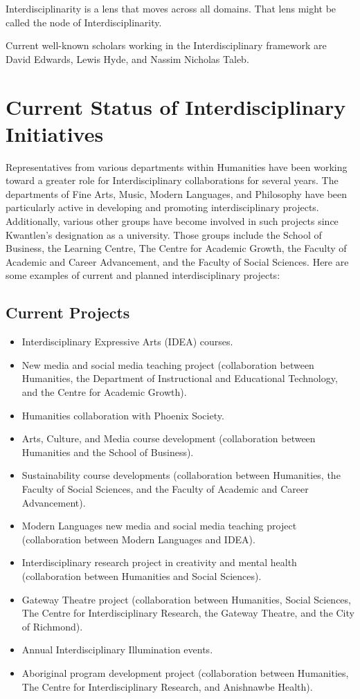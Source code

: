 \documentclass[12pt,DIV11,letterpaper,oneside,abstractoff,headsepline]{scrreprt}
\begin{document}
Interdisciplinarity is a lens that moves across all domains. That lens might be called the node of Interdisciplinarity.

Current well-known scholars working in the Interdisciplinary framework are David Edwards, Lewis Hyde, and Nassim Nicholas Taleb.

\newpage
\section{Current Status of Interdisciplinary Initiatives}
\label{sec-2}

Representatives from various departments within Humanities have been working toward a greater role for Interdisciplinary collaborations for several years. The departments of Fine Arts, Music, Modern Languages, and Philosophy have been particularly active in developing and promoting interdisciplinary projects. Additionally, various other groups have become involved in such projects since Kwantlen's designation as a university. Those groups include the School of Business, the Learning Centre, The Centre for Academic Growth, the Faculty of Academic and Career Advancement, and the Faculty of Social Sciences. Here are some examples of current and planned interdisciplinary projects:
\subsection{Current Projects}
\label{sec-2.1}

\begin{itemize}
\item Interdisciplinary Expressive Arts (IDEA) courses.
\item New media and social media teaching project (collaboration between
    Humanities, the Department of Instructional and Educational
    Technology, and the Centre for Academic Growth).
\item Humanities collaboration with Phoenix Society.
\item Arts, Culture, and Media course development (collaboration
    between Humanities and the School of Business).
\item Sustainability course developments (collaboration between
    Humanities, the Faculty of Social Sciences, and the Faculty of
    Academic and Career Advancement).
\item Modern Languages new media and social media teaching project
    (collaboration between Modern Languages and IDEA).
\item Interdisciplinary research project in creativity and mental
    health (collaboration between Humanities and Social Sciences).
  \item Gateway Theatre project (collaboration between Humanities, Social Sciences, The Centre for Interdisciplinary Research, the Gateway Theatre, and the City of Richmond).
  \item Annual Interdisciplinary Illumination events.
  \item Aboriginal program development project (collaboration between Humanities, The Centre for Interdisciplinary Research, and Anishnawbe Health).
\end{itemize}
\end{document}
